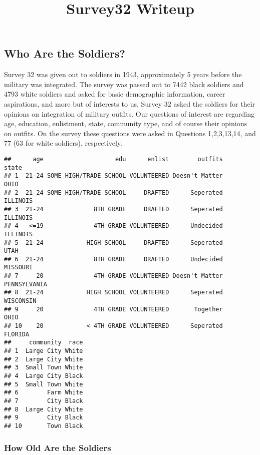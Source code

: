 \documentclass[]{article}
\title{Survey32 Writeup}
\author{}
\date{\vspace{-2.5em}}
\begin{document}
\maketitle

\subsection{Who Are the Soldiers?}\label{who-are-the-soldiers}

Survey 32 was given out to soldiers in 1943, approximately 5 years
before the military was integrated. The survey was passed out to 7442
black soldiers and 4793 white soldiers and asked for basic demographic
information, career aspirations, and more but of interests to us, Survey
32 asked the soldiers for their opinions on integration of military
outfits. Our questions of interest are regarding age, education,
enlistment, state, community type, and of course their opinions on
outfits. On the survey these questions were asked in Questions
1,2,3,13,14, and 77 (63 for white soldiers), respectively.

\begin{verbatim}
##      age                    edu      enlist        outfits        state
## 1  21-24 SOME HIGH/TRADE SCHOOL VOLUNTEERED Doesn't Matter         OHIO
## 2  21-24 SOME HIGH/TRADE SCHOOL     DRAFTED      Seperated     ILLINOIS
## 3  21-24              8TH GRADE     DRAFTED      Seperated     ILLINOIS
## 4   <=19              4TH GRADE VOLUNTEERED      Undecided     ILLINOIS
## 5  21-24            HIGH SCHOOL     DRAFTED      Seperated         UTAH
## 6  21-24              8TH GRADE     DRAFTED      Undecided     MISSOURI
## 7     20              4TH GRADE VOLUNTEERED Doesn't Matter PENNSYLVANIA
## 8  21-24            HIGH SCHOOL VOLUNTEERED      Seperated    WISCONSIN
## 9     20              4TH GRADE VOLUNTEERED       Together         OHIO
## 10    20            < 4TH GRADE VOLUNTEERED      Seperated      FLORIDA
##     community  race
## 1  Large City White
## 2  Large City White
## 3  Small Town White
## 4  Large City Black
## 5  Small Town White
## 6        Farm White
## 7        City Black
## 8  Large City White
## 9        City Black
## 10       Town Black
\end{verbatim}

\subsubsection{How Old Are the Soldiers}\label{how-old-are-the-soldiers}
\end{document}
